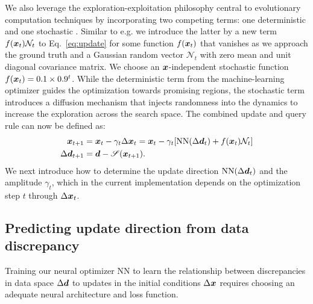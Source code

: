 We also leverage the exploration-exploitation philosophy central to evolutionary computation techniques by incorporating two competing terms: one deterministic and one stochastic \citep{Holland1975}. Similar to e.g. \citet{Fornasier2021,Riedl2023} we introduce the latter by a new term $f(\boldsymbol{x}_{t})\mathcal{N}_{t}$ to Eq.~\eqref{eq:update} for some function $f(\boldsymbol{x}_{t})$ that vanishes as we approach the ground truth and a Gaussian random vector $\mathcal{N}_{t}$ with zero mean and unit diagonal covariance matrix. We choose an $\boldsymbol{x}$-independent stochastic function $f(\boldsymbol{x}_{t}) = 0.1 \times 0.9^t$. While the deterministic term from the machine-learning optimizer guides the optimization towards promising regions, the stochastic term introduces a diffusion mechanism that injects randomness into the dynamics to increase the exploration across the search space. The combined update and query rule can now be defined as:
\begin{align}
    \boldsymbol{x}_{t+1} & = \boldsymbol{x}_{t} - \gamma_t \Delta \boldsymbol{x}_t = \boldsymbol{x}_{t} - \gamma_t [\mathrm{NN}(\Delta \boldsymbol{d}_{t}) + f(\boldsymbol{x}_{t})\mathcal{N}_{t}] 
    \label{eq:update_rule1} \\
    \Delta \boldsymbol{d}_{t+1} & = \boldsymbol{d} - \mathscr{S}(\boldsymbol{x}_{t+1}).
    \label{eq:update_rule2}
\end{align}
We next introduce how to determine the update direction $\mathrm{NN}(\Delta \boldsymbol{d}_{t})$ and the amplitude $\gamma_t$, which in the current implementation depends on the optimization step $t$ through $\Delta \boldsymbol{x}_t$. 

\subsection{Predicting update direction from data discrepancy}
\label{sec:update_direction}

Training our neural optimizer $\mathrm{NN}$ to learn the relationship between discrepancies in data space $\Delta \boldsymbol{d}$ to updates in the initial conditions $\Delta \boldsymbol{x}$ requires choosing an adequate neural architecture and loss function. 

